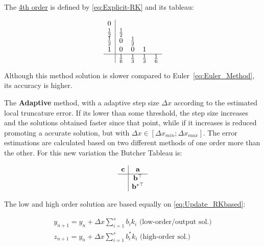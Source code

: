 The \underline{ 4th order} is defined by \eqref{eq:Explicit-RK} and its tableau:

\begin{equation}
    \begin{array}{c|cccc}
        0\\
        \frac{1}{2} & \frac{1}{2}\\
        \frac{1}{2} & 0 & \frac{1}{2} \\
        1 & 0 & 0 & 1\\
        \hline
        & \frac{1}{6} & \frac{1}{3} & \frac{1}{3} & \frac{1}{6}  
    \end{array}
    \label{eq:RK4_Tableu}
\end{equation}

Although this method solution is slower compared to Euler~\eqref{eq:Euler_Method}, its accuracy is higher. \par
The \textbf{Adaptive } \label{subsubsub:RK_Adaptive} method, with a adaptive step size \(\Delta x\) according to the estimated local truncature error. If its lower than some threshold, the step size increases and the solutions obtained faster since that point, while if it increases is reduced promoting a accurate solution, but with \(\Delta x \in [\Delta x_{min}; \Delta x_{max}]\).  The error estimations are calculated based on two different methods of one order more than the other. For this new  variation the Butcher Tableau is:

\begin{equation} 
    \begin{array}{c|c}
        \mathbf{c} & \mathbf{a} \\
        \hline
        & \mathbf{b}^\top  \\
        & \mathbf{b}^{*\top }
    \end{array}
    \label{eq:Explicit_Butcher_Tableu}
\end{equation}


The low and high order solution are based equally on \eqref{eq:Update_RKbased}:

\begin{subequations}
    \begin{align}
        y_{n+1} = y_n + \Delta x \sum^{s}_{i=1}b_i k_i \text{  (low-order/output sol.)} \label{eq:Update_Output_adaptiveRK} \\
        z_{n+1} = y_n + \Delta x \sum^{s}_{i=1}b^*_i k_i \text{  (high-order sol.)} \label{eq:Update_HighOrder_adaptiveRK} 
    \end{align}
    \label{eq:Update_Adaptive-RK}  
\end{subequations}

